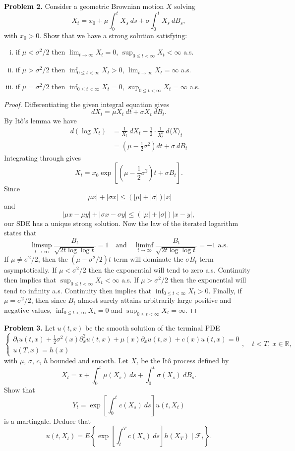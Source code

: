 \documentclass[11pt,letterpaper]{report}
\newcommand{\reals}{\mathbb{R}}
\newcommand{\mcal}[1]{\mathcal{#1}}
\begin{document}
\noindent\textbf{Problem 2. }
Consider a geometric Brownian motion $X$ solving
\[
X_t = x_0 + \mu\int_0^tX_s\ ds + \sigma\int_0^tX_s\ dB_s,
\]
with $x_0>0$. Show that we have a strong solution satisfying:
\begin{enumerate}[(i)]
	\item if $\mu<\sigma^2/2$ then $\lim_{t\to \infty}X_t = 0$, $\sup_{0\leq t<\infty}X_t<\infty$ a.s.
	\item if $\mu>\sigma^2/2$ then $\inf_{0\leq t<\infty}X_t>0$, $\lim_{t\to \infty}X_t = \infty$ a.s.
	\item if $\mu=\sigma^2/2$ then $\inf_{0\leq t< \infty}X_t = 0$, $\sup_{0\leq t<\infty}X_t =\infty$ a.s.
\end{enumerate}
\begin{proof}
	Differentiating the given integral equation gives
	\[
	dX_t = \mu X_t\ dt + \sigma X_t\ dB_t.
	\]
	By It\^o's lemma we have
	\begin{align*}
		d(\log X_t) &= \frac{1}{X_t}\ dX_t - \frac{1}{2}\cdot\frac{1}{X_t^2}\ d\langle X\rangle_t\\
		&= \left(\mu - \frac{1}{2}\sigma^2\right)dt + \sigma\ dB_t
	\end{align*}
	Integrating through gives
	\[
	X_t = x_0\exp\left[\left(\mu-\frac{1}{2}\sigma^2\right)t + \sigma B_t \right].
	\]
	Since 
	\[
	|\mu x| + |\sigma x| \leq (|\mu| + |\sigma|)|x|
	\]
	and
	\[
	|\mu x - \mu y| + |\sigma x - \sigma y| \leq (|\mu|+|\sigma|)|x-y|,
	\]
	our SDE has a unique strong solution. Now the law of the iterated logarithm states that
	\[
	\limsup_{t\to \infty}\frac{B_t}{\sqrt{2t\log\log t}} = 1\quad\text{and}\quad \liminf_{t\to \infty}\frac{B_t}{\sqrt{2t\log\log t}} = -1\text{ a.s.}
	\]
	If $\mu\neq \sigma^2/2$, then the $(\mu - \sigma^2/2)t$ term will dominate the $\sigma B_t$ term asymptotically. If $\mu<\sigma^2/2$ then the exponential will tend to zero a.s. Continuity then implies that $\sup_{0\leq t<\infty}X_t<\infty$ a.s. If $\mu > \sigma^2/2$ then the exponential will tend to infinity a.s. Continuity then implies that $\inf_{0\leq t<\infty}X_t>0$. Finally, if $\mu=\sigma^2/2$, then since $B_t$ almost surely attains arbitrarily large positive and negative values, $\inf_{0\leq t<\infty}X_t=0$ and $\sup_{0\leq t<\infty}X_t = \infty$.
\end{proof}


\noindent\textbf{Problem 3. }
Let $u(t, x)$ be the smooth solution of the terminal PDE
\[
\begin{cases}
	\partial_tu(t,x) + \frac{1}{2}\sigma^2(x)\partial^2_xu(t,x) + \mu(x)\partial_xu(t,x)+c(x)u(t,x)=0\\
	u(T,x) = h(x)
\end{cases},\quad t<T,\ x\in \reals,
\]
with $\mu$, $\sigma$, $c$, $h$ bounded and smooth. Let $X_t$ be the It\^o process defined by
\[
X_t = x + \int_0^t\mu(X_s)\ ds + \int_0^t\sigma(X_s)\ dB_s.
\]
Show that
\[
Y_t = \exp\left[\int_0^tc(X_s)\ ds\right]u(t,X_t)
\]
is a martingale. Deduce that
\[
u(t, X_t) = E\left\{\exp\left[\int_t^Tc(X_s)\ ds  \right]h(X_T)\mid \mcal{F}_t \right\}.
\]
\end{document}
